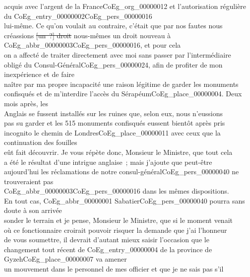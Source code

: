 \documentclass{book}
\begin{document}
acquis avec l’argent de la France\gls{CoEg_org_00000012} et l’autorisation régulière du \gls{CoEg_entry_00000002}\gls{CoEg_pers_00000016}\\
lui-même. Ce qu’on voulait au contraire, c’était que par nos fautes nous\\
créassions \sout{[un~?] droit} nous-mêmes un droit nouveau à \gls{CoEg_abbr_00000003}\gls{CoEg_pers_00000016}, et pour cela\\
on a affecté de traiter directement avec moi sans passer par l’intermédiaire\\
obligé du Consul-Général\gls{CoEg_pers_00000024}, afin de profiter de mon inexpérience et de faire\\
naître par ma propre incapacité une raison légitime de garder les monuments\\
confisqués et de m’interdire l’accès du Sérapéum\gls{CoEg_place_00000004}. Deux mois après, les\\
Anglais se fussent installés sur les ruines que, selon eux, nous n’eussions\\
pas su garder et les 515 monuments confisqués eussent bientôt après pris\\
incognito le chemin de Londres\gls{CoEg_place_00000011} avec ceux que la continuation des fouilles\\
eût fait découvrir. Je vous répète donc, Monsieur le Ministre, que tout cela\\
a été le résultat d’une intrigue anglaise~; mais j’ajoute que peut-être\\
aujourd’hui les réclamations de notre consul-général\gls{CoEg_pers_00000040} ne trouveraient pas\\
\gls{CoEg_abbr_00000003}\gls{CoEg_pers_00000016} dans les mêmes dispositions.\\
\indent En tout cas, \gls{CoEg_abbr_00000001} Sabatier\gls{CoEg_pers_00000040} pourra sans doute à son arrivée\\
sonder le terrain et je pense, Monsieur le Ministre, que si le moment venait\\
où ce fonctionnaire croirait pouvoir risquer la demande que j’ai l’honneur\\
de vous soumettre, il devrait d’autant mieux saisir l’occasion que le\\
changement tout récent de \Gls{CoEg_entry_00000004} de la province de Gyzeh\gls{CoEg_place_00000007} va amener\\
un mouvement dans le personnel de mes officier et que je ne sais pas s’il\\
\end{document}
